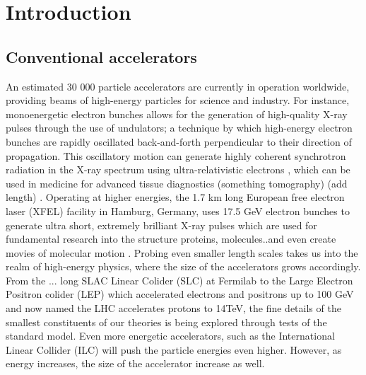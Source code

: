 \chapter{Introduction}
\section{Conventional accelerators}\vspace{-8pt}
An estimated 30 000 particle accelerators are currently in operation worldwide, 
providing beams of high-energy particles for science and industry. 
For instance, monoenergetic electron bunches allows for the generation of high-quality X-ray pulses through the use of undulators; a technique by which high-energy electron bunches are rapidly oscillated back-and-forth perpendicular to their direction of propagation. This oscillatory motion can generate highly coherent synchrotron radiation in the X-ray spectrum using  ultra-relativistic electrons , which can be used in medicine for advanced tissue diagnostics  (something tomography) (add length) . Operating at higher energies, the 1.7 km long European free electron laser (XFEL) facility in Hamburg, Germany, uses 17.5 GeV electron bunches to generate ultra short, extremely brilliant X-ray pulses which are used for fundamental research into the structure proteins, molecules..and even create movies of molecular motion \cite{xfel}. Probing even smaller length scales takes us into the realm of high-energy physics, where the size of the accelerators grows accordingly. From the ... long SLAC Linear Colider (SLC) at Fermilab to the Large Electron Positron colider (LEP) which accelerated electrons and positrons up to 100 GeV and now named the LHC accelerates protons to 14TeV, the fine details of the smallest constituents of our theories is being explored through tests of the standard model. Even more energetic accelerators, such as the International Linear Collider (ILC) will push the particle energies even higher. However, as energy increases, the size of the accelerator increase as well. \\
